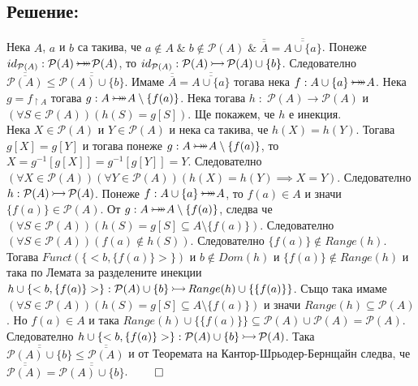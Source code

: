 \documentclass[12pt]{article}
\newcommand{\injection}[0]{\,\mathlarger{\mathlarger{\rightarrowtail}}\,}
\newcommand{\bijection}[0]{\mathbin{\mathlarger{\mathlarger{\rightarrowtail}} \hspace{-14pt} \mathlarger{\mathlarger{\twoheadrightarrow}}}}
\begin{document}
\subsection*{Решение:}
Нека \(A\), \(a\) и \(b\) са такива, че
\(a \notin A \; \& \; b \notin \mathcal{P}(A) \; \& \; \overline{\overline{A}} = \overline{\overline{A \cup \{a\}}}\).
Понеже \(id_{\mathcal{P}(A)} : \mathcal{P}(A) \bijection \mathcal{P}(A)\),
то \(id_{\mathcal{P}(A)} : \mathcal{P}(A) \injection \mathcal{P}(A) \cup \{b\}\).
Следователно \(\overline{\overline{\mathcal{P}(A)}} \leq \overline{\overline{\mathcal{P}(A) \cup \{b\}}}\).
Имаме \(\overline{\overline{A}} = \overline{\overline{A \cup \{a\}}}\)
тогава нека \(f : A \cup \{a\} \bijection A\).
Нека \(g = f_{\restriction A}\) тогава \(g : A \bijection A \setminus \{f(a)\}\).
Нека тогава \(h \; : \; \mathcal{P}(A) \to \mathcal{P}(A)\) и 
\((\forall S \in \mathcal{P}(A))(h(S) = g[S])\).
Ще покажем, че \(h\) е инекция.
\\
Нека \(X \in \mathcal{P}(A)\) и \(Y \in \mathcal{P}(A)\)
и нека са такива, че \(h(X) = h(Y)\).
Тогава \(g[X] = g[Y]\) и тогава понеже \(g : A \bijection A \setminus \{f(a)\}\),
то \(X = g^{-1}[g[X]] = g^{-1}[g[Y]] = Y\). Следователно 
\((\forall X \in \mathcal{P}(A))(\forall Y \in \mathcal{P}(A))(h(X) = h(Y) \implies X = Y)\). Следователно \(h : \mathcal{P}(A) \injection \mathcal{P}(A)\).
Понеже \(f : A \cup \{a\} \bijection A\), то \(f(a) \in A\) и значи \(\{f(a)\} \in \mathcal{P}(A)\). От \(g : A \bijection A \setminus \{f(a)\}\),
следва че \((\forall S \in \mathcal{P}(A))(h(S) = g[S] \subseteq A \setminus \{f(a)\})\).
Следователно \((\forall S \in \mathcal{P}(A))(f(a) \notin h(S))\).
Следователно \(\{f(a)\} \notin Range(h)\).
Тогава \(Funct(\{<b, \{f(a)\}>\})\) и \(b \notin Dom(h)\) и \(\{f(a)\} \notin Range(h)\)
и така по Лемата за разделените инекции \(h \cup \{<b, \{f(a)\}>\} : \mathcal{P}(A) \cup \{b\} \injection Range(h) \cup \{\{f(a)\}\}\). Също така имаме
\((\forall S \in \mathcal{P}(A))(h(S) = g[S] \subseteq A \setminus \{f(a)\})\)
и значи \(Range(h) \subseteq \mathcal{P}(A)\). Но \(f(a) \in A\) и така
\(Range(h) \cup \{\{f(a)\}\} \subseteq \mathcal{P}(A) \cup \mathcal{P}(A) = \mathcal{P}(A)\).
Следователно \(h \cup \{<b, \{f(a)\}>\} : \mathcal{P}(A) \cup \{b\} \injection \mathcal{P}(A)\). Така \(\overline{\overline{\mathcal{P}(A) \cup \{b\}}} \leq \overline{\overline{\mathcal{P}(A)}}\) и от Теоремата на Кантор-Шрьодер-Бернщайн следва, че \(\overline{\overline{\mathcal{P}(A)}} = \overline{\overline{\mathcal{P}(A) \cup \{b\}}}\). \(\qed\)
\end{document}

